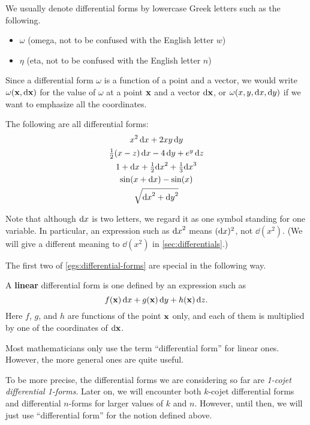 \documentclass[12pt]{amsart}
\begin{document}
We usually denote differential forms by lowercase Greek letters such as the following.
\begin{itemize}
\item $\omega$ (omega, not to be confused with the English letter $w$)
\item $\eta$ (eta, not to be confused with the English letter $n$)
\end{itemize}
Since a differential form $\omega$ is a function of a point and a vector, we would write $\omega(\mathbf{x},{\mathrm{d} \mathbf{x}})$ for the value of $\omega$ at a point $\mathbf{x}$ and a vector ${\mathrm{d} \mathbf{x}}$, or $\omega(x,y,{\mathrm{d} x},{\mathrm{d} y})$ if we want to emphasize all the coordinates.

\begin{egs}\label{egs:differential-forms}
  The following are all differential forms:
  \begin{gather*}
    x^2 \,{\mathrm{d} x} + 2xy \, {\mathrm{d} y}\\
    \textstyle\frac{1}{2}({x-z}) \,{\mathrm{d} x} - 4\, {\mathrm{d} y} + e^y \,{\mathrm{d} z}\\
    1 + {\mathrm{d} x} + \textstyle\frac{1}{2} {\mathrm{d} x}^2 + \textstyle\frac{1}{3} {\mathrm{d} x}^3\\
    \sin(x + {\mathrm{d} x}) - \sin(x)\\
    \sqrt{{\mathrm{d} x}^2+{\mathrm{d} y}^2}
  \end{gather*}
\end{egs}

Note that although ${\mathrm{d} x}$ is two letters, we regard it as one symbol standing for one variable.
In particular, an expression such as ${\mathrm{d} x}^2$ means $({\mathrm{d} x})^2$, not $\dd(x^2)$.
(We will give a different meaning to $\dd(x^2)$ in \cref{sec:differentials}.)

The first two of \cref{egs:differential-forms} are special in the following way.

\begin{defn}
  A \textbf{linear} differential form is one defined by an expression such as
  \[ f(\mathbf{x}) \, {\mathrm{d} x} + g(\mathbf{x}) \, {\mathrm{d} y} + h(\mathbf{x}) \, {\mathrm{d} z}. \]
  Here $f$, $g$, and $h$ are functions of the point $\mathbf{x}$ only, and each of them is multiplied by one of the coordinates of ${\mathrm{d} \mathbf{x}}$.
\end{defn}

Most mathematicians only use the term ``differential form'' for linear ones.
However, the more general ones are quite useful.

\begin{adv}
  To be more precise, the differential forms we are considering so far are \emph{1-cojet differential 1-forms}.
  Later on, we will encounter both $k$-cojet differential forms and differential $n$-forms for larger values of $k$ and $n$.
  However, until then, we will just use ``differential form'' for the notion defined above.
\end{adv}
\end{document}
